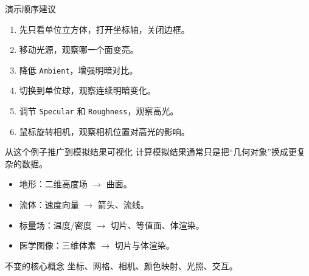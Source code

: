 \documentclass[aspectratio=169,11pt]{ctexbeamer}
\begin{document}


\begin{frame}{演示顺序建议}
  \begin{enumerate}
    \item 先只看单位立方体，打开坐标轴，关闭边框。
    \item 移动光源，观察哪一个面变亮。
    \item 降低 \texttt{Ambient}，增强明暗对比。
    \item 切换到单位球，观察连续明暗变化。
    \item 调节 \texttt{Specular} 和 \texttt{Roughness}，观察高光。
    \item 鼠标旋转相机，观察相机位置对高光的影响。
  \end{enumerate}
\end{frame}

\begin{frame}{从这个例子推广到模拟结果可视化}
  计算模拟结果通常只是把“几何对象”换成更复杂的数据。

  \begin{itemize}
    \item 地形：二维高度场 \(\rightarrow\) 曲面。
    \item 流体：速度向量 \(\rightarrow\) 箭头、流线。
    \item 标量场：温度/密度 \(\rightarrow\) 切片、等值面、体渲染。
    \item 医学图像：三维体素 \(\rightarrow\) 切片与体渲染。
  \end{itemize}

  \begin{block}{不变的核心概念}
    坐标、网格、相机、颜色映射、光照、交互。
  \end{block}
\end{frame}
\end{document}
